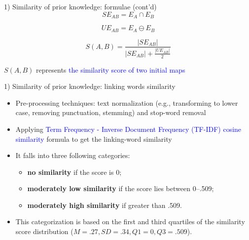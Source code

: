 \begin{frame}{1) Similarity of prior knowledge: formulae (cont'd)}
    \begin{equation}
      SE_{AB} = E_A \cap E_B \label{eq:1}
    \end{equation}
    
    \begin{equation}
      UE_{AB} = E_A \ominus E_B \label{eq:2}
    \end{equation}
    
    \begin{equation}
      S(A, B) = \frac{|SE_{AB}|}{{|SE_{AB}| + \frac{|UE_{AB}|}{2}}} \label{eq:3}
    \end{equation}
    
    $S(A, B)$ represents \textcolor{blue}{the similarity score of two initial maps}
\end{frame}

\begin{frame}{1) Similarity of prior knowledge: linking words similarity}
    \begin{itemize}
        \item Pre-processing techniques: text normalization 
              (e.g., transforming to lower case, removing punctuation, stemming) 
              and stop-word removal
        \item Applying \textcolor{blue}{Term Frequency - Inverse Document Frequency (TF-IDF) cosine similarity} formula to get the linking-word similarity
        \item It falls into three following categories: 
        \begin{itemize}
            \item \textbf{no similarity} if the score is 0; 
            \item \textbf{moderately low similarity} if the score lies between 0--.509;
            \item \textbf{moderately high similarity} if greater than .509.
        \end{itemize} 
        \item This categorization is based on the first and third quartiles 
        of the similarity score distribution ($M = .27, SD = .34, Q1 = 0, Q3 = .509$).
    \end{itemize}
\end{frame}

